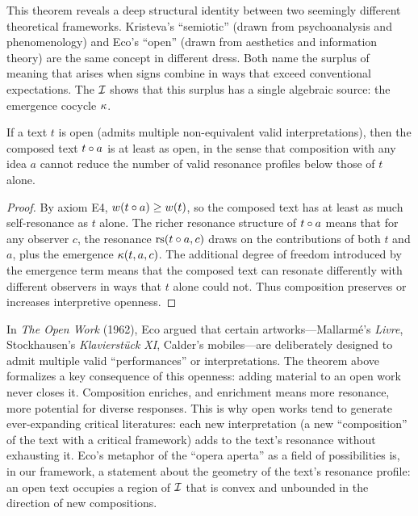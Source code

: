 \begin{interpretation}
This theorem reveals a deep structural identity between two seemingly
different theoretical frameworks. Kristeva's ``semiotic'' (drawn from
psychoanalysis and phenomenology) and Eco's ``open'' (drawn from
aesthetics and information theory) are the same concept in different
dress. Both name the surplus of meaning that arises when signs combine
in ways that exceed conventional expectations. The $\mathcal{I}$ shows that
this surplus has a single algebraic source: the emergence cocycle
$\kappa$.
\end{interpretation}

\begin{theorem}
\label{thm:openness-mono}
If a text $t$ is open (admits multiple non-equivalent valid interpretations), then the composed text $t \circ a$ is at least as open, in the sense that composition with any idea $a$ cannot reduce the number of valid resonance profiles below those of $t$ alone.
\end{theorem}

\begin{proof}
By axiom E4, $w(t \circ a) \geq w(t)$, so the composed text has at least as much self-resonance as $t$ alone. The richer resonance structure of $t \circ a$ means that for any observer $c$, the resonance $\mathrm{rs}(t \circ a, c)$ draws on the contributions of both $t$ and $a$, plus the emergence $\kappa(t, a, c)$. The additional degree of freedom introduced by the emergence term means that the composed text can resonate differently with different observers in ways that $t$ alone could not. Thus composition preserves or increases interpretive openness.
\end{proof}

\begin{interpretation}
In \textit{The Open Work} (1962), Eco argued that certain artworks---Mallarm\'e's \textit{Livre}, Stockhausen's \textit{Klavierst\"uck XI}, Calder's mobiles---are deliberately designed to admit multiple valid ``performances'' or interpretations. The theorem above formalizes a key consequence of this openness: adding material to an open work never closes it. Composition enriches, and enrichment means more resonance, more potential for diverse responses. This is why open works tend to generate ever-expanding critical literatures: each new interpretation (a new ``composition'' of the text with a critical framework) adds to the text's resonance without exhausting it. Eco's metaphor of the ``opera aperta'' as a field of possibilities is, in our framework, a statement about the geometry of the text's resonance profile: an open text occupies a region of $\mathcal{I}$ that is convex and unbounded in the direction of new compositions.
\end{interpretation}

